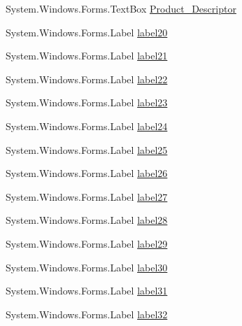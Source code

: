 \begin{DoxyCompactItemize}
\item 
System.\+Windows.\+Forms.\+Text\+Box \mbox{\hyperlink{class_cert_complete_1_1_test___creation___form_aa35caab6366f92cfe348ee0dd4fe1ac1}{Product\+\_\+\+Descriptor}}
\item 
System.\+Windows.\+Forms.\+Label \mbox{\hyperlink{class_cert_complete_1_1_test___creation___form_ae1ff607904b12dca6b4a49b955648933}{label20}}
\item 
System.\+Windows.\+Forms.\+Label \mbox{\hyperlink{class_cert_complete_1_1_test___creation___form_a2aa30018bfe8045eb9d427d053cc4470}{label21}}
\item 
System.\+Windows.\+Forms.\+Label \mbox{\hyperlink{class_cert_complete_1_1_test___creation___form_abed0bbe96ee128be80200ac4105051ad}{label22}}
\item 
System.\+Windows.\+Forms.\+Label \mbox{\hyperlink{class_cert_complete_1_1_test___creation___form_a5fa0bc75151c989c4389738406133c9e}{label23}}
\item 
System.\+Windows.\+Forms.\+Label \mbox{\hyperlink{class_cert_complete_1_1_test___creation___form_aa516d815523187146afd1de5ca20508e}{label24}}
\item 
System.\+Windows.\+Forms.\+Label \mbox{\hyperlink{class_cert_complete_1_1_test___creation___form_ae8b8f62551215777258531027c192398}{label25}}
\item 
System.\+Windows.\+Forms.\+Label \mbox{\hyperlink{class_cert_complete_1_1_test___creation___form_a3f2cd50bc685aa18b5a9933626ce1c05}{label26}}
\item 
System.\+Windows.\+Forms.\+Label \mbox{\hyperlink{class_cert_complete_1_1_test___creation___form_ae570b087866cc11c8fff6327166ea812}{label27}}
\item 
System.\+Windows.\+Forms.\+Label \mbox{\hyperlink{class_cert_complete_1_1_test___creation___form_a7057e4f13a041568c48b75af343803eb}{label28}}
\item 
System.\+Windows.\+Forms.\+Label \mbox{\hyperlink{class_cert_complete_1_1_test___creation___form_a49371514f249fe49a885bea7207fb282}{label29}}
\item 
System.\+Windows.\+Forms.\+Label \mbox{\hyperlink{class_cert_complete_1_1_test___creation___form_ae8ed00845f66b9f244ab7d7758d9b26e}{label30}}
\item 
System.\+Windows.\+Forms.\+Label \mbox{\hyperlink{class_cert_complete_1_1_test___creation___form_aebe0abd340199b0a2f90640e393615e5}{label31}}
\item 
System.\+Windows.\+Forms.\+Label \mbox{\hyperlink{class_cert_complete_1_1_test___creation___form_ae796e8713910df312e15f9da0a85a5de}{label32}}

\end{DoxyCompactItemize}
